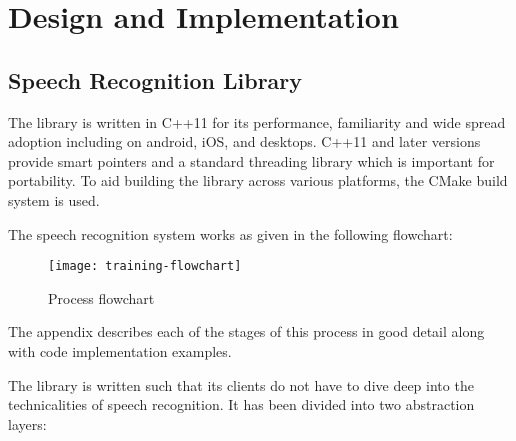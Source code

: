 \chapter{Design and Implementation} \label{ch:proposal}

\section{Speech Recognition Library}

The library is written in C++11 for its performance, familiarity and wide spread adoption including on android, iOS, and desktops. 
C++11 and later versions provide smart pointers and a standard threading library which is important for portability. To aid building the library across various platforms, the CMake build system is used.

The speech recognition system works as given in the following flowchart:

\begin{figure}[h!]
    \centering
    \texttt{[image: training-flowchart]}
    \label{fig:training-flowchart}
    \caption{Process flowchart}
\end{figure}

The appendix describes each of the stages of this process in good detail along with code implementation examples.

The library is written such that its clients do not have to dive deep into the technicalities of speech recognition. It has been divided into two abstraction layers:

